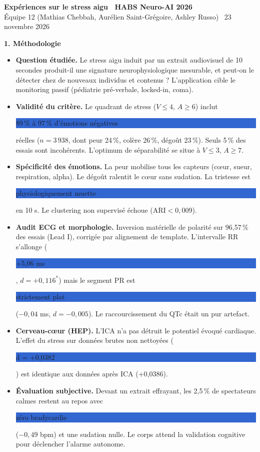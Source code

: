 \documentclass[10pt,a4paper]{article}
\newcommand{\hl}[1]{\colorbox{highlight}{\strut #1}}
\begin{document}
\begin{center}
  {\Large\bfseries Expériences sur le stress aigu \textbar\ HABS Neuro-AI 2026}\\[3pt]
  {\normalsize Équipe 12 (Mathias Chebbah, Aurélien Saint-Grégoire, Ashley Russo) \textbar\ 23 novembre 2026}
\end{center}

\vspace{5pt}

{\large\bfseries 1. Méthodologie}

\vspace{2pt}

\begin{itemize}
  \item \textbf{Question étudiée.} Le stress aigu induit par un extrait audiovisuel de 10 secondes produit-il une signature neurophysiologique mesurable, et peut-on le détecter chez de nouveaux individus et contenus ? L'application cible le monitoring passif (pédiatrie pré-verbale, locked-in, coma).
  \item \textbf{Validité du critère.} Le quadrant de stress ($V \le 4$, $A \ge 6$) inclut \hl{89\,\% à 97\,\% d'émotions négatives} réelles ($n = 3\,938$, dont peur 24\,\%, colère 26\,\%, dégoût 23\,\%). Seuls 5\,\% des essais sont incohérents. L'optimum de séparabilité se situe à $V \le 3$, $A \ge 7$.
  \item \textbf{Spécificité des émotions.} La peur mobilise tous les capteurs (cœur, sueur, respiration, alpha). Le dégoût ralentit le cœur sans sudation. La tristesse est \hl{physiologiquement muette} en 10 s. Le clustering non supervisé échoue ($\mathrm{ARI} < 0,009$).
  \item \textbf{Audit ECG et morphologie.} Inversion matérielle de polarité sur 96,57\,\% des essais (Lead I), corrigée par alignement de template. L'intervalle RR s'allonge (\hl{+5,06 ms}, $d = +0,116^*$) mais le segment PR est \hl{strictement plat} ($-0,04$ ms, $d = -0,005$). Le raccourcissement du QTc était un pur artefact.
  \item \textbf{Cerveau-cœur (HEP).} L'ICA n'a pas détruit le potentiel évoqué cardiaque. L'effet du stress sur données brutes non nettoyées (\hl{d = +0,0382}) est identique aux données après ICA (+0,0386).
  \item \textbf{Évaluation subjective.} Devant un extrait effrayant, les 2,5\,\% de spectateurs calmes restent au repos avec \hl{zéro bradycardie} ($-0,49$ bpm) et une sudation nulle. Le corps attend la validation cognitive pour déclencher l'alarme autonome.
\end{itemize}
\end{document}
